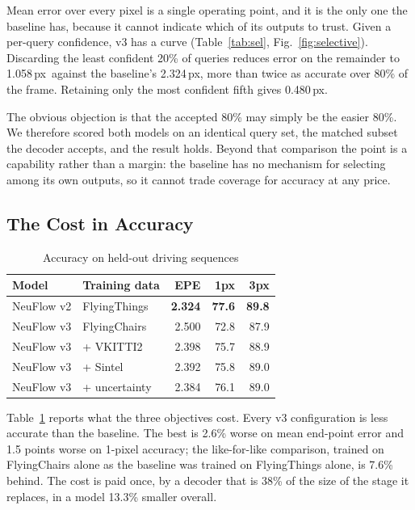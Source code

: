 \documentclass[conference]{IEEEtran}
\newcommand{\px}{\,px}
\begin{document}
Mean error over every pixel is a single operating point, and it is the only one
the baseline has, because it cannot indicate which of its outputs to trust. Given
a per-query confidence, v3 has a curve (Table~\ref{tab:sel},
Fig.~\ref{fig:selective}). Discarding the least confident 20\% of queries reduces
error on the remainder to 1.058\px\ against the baseline's 2.324\px, more than
twice as accurate over 80\% of the frame. Retaining only the most confident fifth
gives 0.480\px.

The obvious objection is that the accepted 80\% may simply be the easier 80\%. We
therefore scored both models on an identical query set, the matched subset the
decoder accepts, and the result holds. Beyond that comparison the point is a
capability rather than a margin: the baseline has no mechanism for selecting
among its own outputs, so it cannot trade coverage for accuracy at any price.

\subsection{The Cost in Accuracy}

\begin{table}[t]
\caption{Accuracy on held-out driving sequences}
\label{tab:acc}
\centering
\begin{tabular}{llrrr}
\toprule
Model & Training data & EPE & 1px & 3px \\
\midrule
NeuFlow v2 & FlyingThings & \textbf{2.324} & \textbf{77.6} & \textbf{89.8} \\
NeuFlow v3 & FlyingChairs & 2.500 & 72.8 & 87.9 \\
NeuFlow v3 & \; + VKITTI2 & 2.398 & 75.7 & 88.9 \\
NeuFlow v3 & \; + Sintel & 2.392 & 75.8 & 89.0 \\
NeuFlow v3 & \; + uncertainty & 2.384 & 76.1 & 89.0 \\
\bottomrule
\end{tabular}
\end{table}

Table~\ref{tab:acc} reports what the three objectives cost. Every v3
configuration is less accurate than the baseline. The best is 2.6\% worse on mean
end-point error and 1.5 points worse on 1-pixel accuracy; the like-for-like
comparison, trained on FlyingChairs alone as the baseline was trained on
FlyingThings alone, is 7.6\% behind. The cost is paid once, by a decoder that is
38\% of the size of the stage it replaces, in a model 13.3\% smaller overall.
\end{document}
